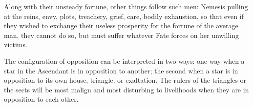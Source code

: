 Along with their unsteady fortune, other things follow such men: Nemesis pulling at the reins, envy, plots, treachery, grief, care, bodily exhaustion, so that even if they wished to exchange their useless prosperity for the fortune of the average man, they cannot do so, but must suffer whatever Fate forces on her unwilling victims. 

The configuration of opposition can be interpreted in two ways: one way when a star in the Ascendant is in opposition to another; the second when a star is in opposition to its own house, triangle, or exaltation. The rulers of the triangles or the sects will be most malign and most disturbing to livelihoods when they are in opposition to each other.

\newpage
